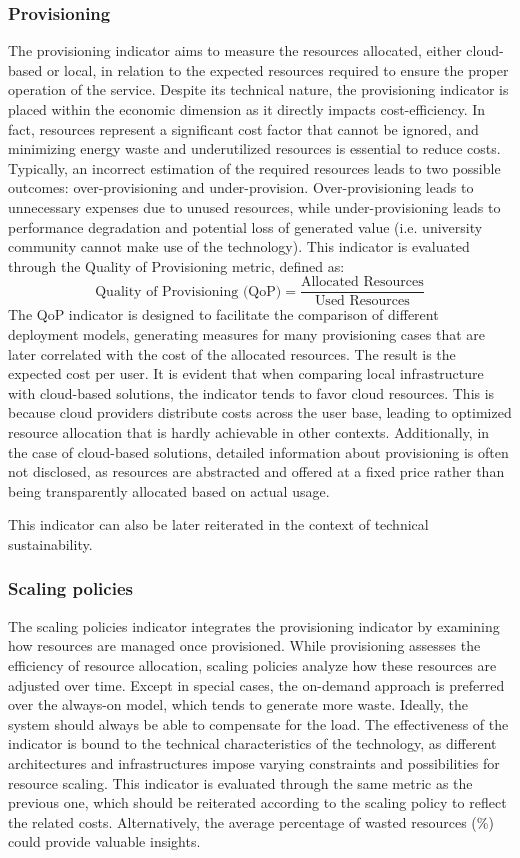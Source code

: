 \subsubsection{Provisioning}
The provisioning indicator aims to measure the resources allocated, either cloud-based or local, in relation to the expected resources required to ensure the proper operation of the service. Despite its technical nature, the provisioning indicator is placed within the economic dimension as it directly impacts cost-efficiency. In fact, resources represent a significant cost factor that cannot be ignored, and minimizing energy waste and underutilized resources is essential to reduce costs. Typically, an incorrect estimation of the required resources leads to two possible outcomes: over-provisioning and under-provision. Over-provisioning leads to unnecessary expenses due to unused resources, while under-provisioning leads to performance degradation and potential loss of generated value (i.e. university community cannot make use of the technology).
This indicator is evaluated through the Quality of Provisioning metric, defined as:
\[
\text{Quality of Provisioning (QoP)} = \frac{\text{Allocated Resources}}{\text{Used Resources}}
\]
The QoP indicator is designed to facilitate the comparison of different deployment models, generating measures for many provisioning cases that are later correlated with the cost of the allocated resources. The result is the expected cost per user. It is evident that when comparing local infrastructure with cloud-based solutions, the indicator tends to favor cloud resources. This is because cloud providers distribute costs across the user base, leading to optimized resource allocation that is hardly achievable in other contexts. Additionally, in the case of cloud-based solutions, detailed information about provisioning is often not disclosed, as resources are abstracted and offered at a fixed price rather than being transparently allocated based on actual usage.

This indicator can also be later reiterated in the context of technical sustainability.

\subsubsection{Scaling policies}
The scaling policies indicator integrates the provisioning indicator by examining how resources are managed once provisioned. While provisioning assesses the efficiency of resource allocation, scaling policies analyze how these resources are adjusted over time.
Except in special cases, the on-demand approach is preferred over the always-on model, which tends to generate more waste. Ideally, the system should always be able to compensate for the load. The effectiveness of the indicator is bound to the technical characteristics of the technology, as different architectures and infrastructures impose varying constraints and possibilities for resource scaling. This indicator is evaluated through the same metric as the previous one, which should be reiterated according to the scaling policy to reflect the related costs. Alternatively, the average percentage of wasted resources (\%) could provide valuable insights.


